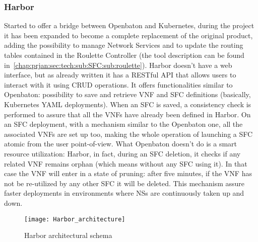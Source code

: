\subsubsection{Harbor}
\label{chap:archimpl:sec:secondattempt:sub:harbor}
Started to offer a bridge between Openbaton and Kubernetes, during the project 
it has been expanded to become a complete replacement of the original product, 
adding the possibility to manage Network Services and to update the routing 
tables contained in the Roulette Controller (the tool description can be found 
in~\ref{chap:prjan:sec:tech:sub:SFC:sub:roulette}). Harbor doesn't have a web 
interface, but as already written it has a RESTful API that allows users to 
interact with it using CRUD operations. It offers functionalities similar to 
Openbaton: possibility to save and retrieve VNF and SFC definitions (basically, 
Kubernetes YAML deployments). When an SFC is saved, a consistency check is 
performed to assure that all the VNFs have already been defined in Harbor. On 
an SFC deployment, with a mechanism similar to the Openbaton one, all the 
associated VNFs are set up too, making the whole operation of launching a SFC 
atomic from the user point-of-view. What Openbaton doesn't do is a smart 
resource utilization: Harbor, in fact, during an SFC deletion, it checks if any 
related VNF remains orphan (which means without any SFC using it). In that case 
the VNF will enter in a state of pruning: after five minutes, if the VNF has 
not be re-utilized by any other SFC it will be deleted. This mechanism assure 
faster deployments in environments where NSs are continuously taken up and 
down.

\begin{figure}[t]
 \centering
 \texttt{[image: Harbor\_architecture]}
 \caption[Harbor architectural schema]{Harbor architectural schema}
 \label{chap:archimpl:sec:secondattempt:img:harborarchitecture}
\end{figure}



